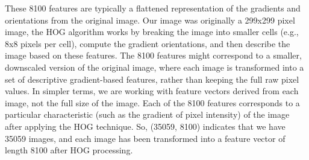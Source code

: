 \documentclass{article}
\begin{document}
These 8100 features are typically a flattened representation of the gradients and orientations from the original image. Our image was originally a 299x299 
pixel image, the HOG algorithm works by breaking the image into smaller cells (e.g., 8x8 pixels per cell), compute the gradient orientations, 
and then describe the image based on these features. The 8100 features might correspond to a smaller, downscaled version of the original image, where each image
is transformed into a set of descriptive gradient-based features, rather than keeping the full raw pixel values.
In simpler terms, we are working with feature vectors derived from each image, not the full size of the image. Each of the 8100 features corresponds to a 
particular characteristic (such as the gradient of pixel intensity) of the image after applying the HOG technique.
So, (35059, 8100) indicates that we have 35059 images, and each image has been transformed into a feature vector of length 8100 after HOG processing.
\end{document}
